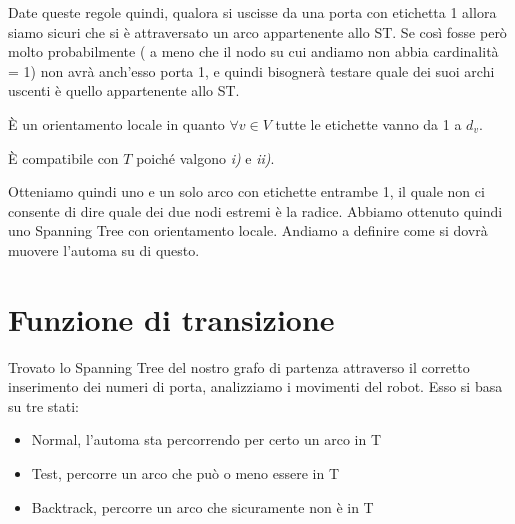 Date queste regole quindi, qualora si uscisse da una porta con etichetta 1
allora siamo sicuri che si è attraversato un arco appartenente allo ST. Se così
fosse però molto probabilmente ( a meno che il nodo su cui andiamo non abbia
cardinalità = 1) non avrà anch'esso porta 1, e quindi bisognerà testare quale
dei suoi archi uscenti è quello appartenente allo ST.


È un orientamento locale in quanto $\forall v \in V$ tutte le etichette vanno da
1 a $d_v$.

È compatibile con $T$ poiché valgono \textit{i)} e \textit{ii)}.

Otteniamo quindi uno e un solo arco con etichette entrambe 1, il quale non ci
consente di dire quale dei due nodi estremi è la radice. Abbiamo ottenuto quindi
uno Spanning Tree con orientamento locale. Andiamo a definire come si dovrà
muovere l'automa su di questo.

\section{Funzione di transizione}
Trovato lo Spanning Tree del nostro grafo di partenza attraverso il corretto
inserimento dei numeri di porta, analizziamo i movimenti del robot. Esso si basa
su tre stati:
\begin{itemize}
    \item Normal, l'automa sta percorrendo per certo un arco in T
    \item Test, percorre un arco che può o meno essere in T
    \item Backtrack, percorre un arco che sicuramente non è in T
\end{itemize}
